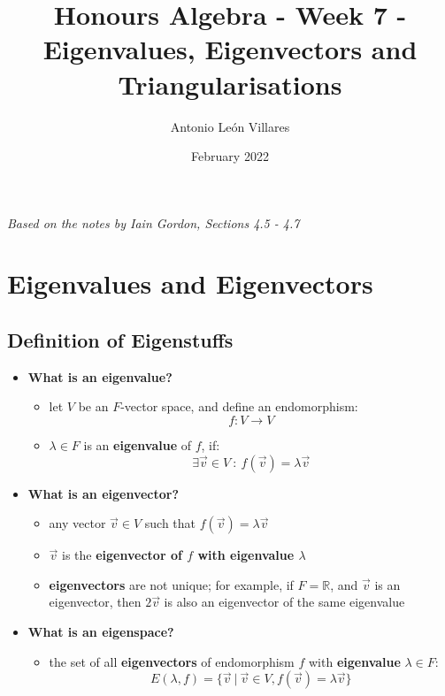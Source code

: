 \documentclass{exam}
\title{Honours Algebra - Week 7 - Eigenvalues, Eigenvectors and Triangularisations}
\author{Antonio León Villares}
\date{February 2022}
\begin{document}
\maketitle

\tableofcontents

\pagebreak

\textit{Based on the notes by Iain Gordon, Sections 4.5 - 4.7}

\section{Eigenvalues and Eigenvectors}

\subsection{Definition of Eigenstuffs}

\begin{itemize}
    \item \textbf{What is an eigenvalue?}
    \begin{itemize}
        \item let $V$ be an $F$-vector space, and define an endomorphism:
        \[
        f : V \to V
        \]
        \item $\lambda \in F$ is an \textbf{eigenvalue} of $f$, if:
        \[
        \exists \vec{v} \in V \ : \ f(\vec{v}) = \lambda \vec{v}
        \]
    \end{itemize}
    \item \textbf{What is an eigenvector?}
        \begin{itemize}
            \item any vector $\vec{v} \in V$ such that $f(\vec{v}) = \lambda \vec{v}$
            \item $\vec{v}$ is the \textbf{eigenvector of $f$ with eigenvalue $\lambda$}
            \item \textbf{eigenvectors} are not unique; for example, if $F = \mathbb{R}$, and $\vec{v}$ is an eigenvector, then $2\vec{v}$ is also an eigenvector of the same eigenvalue
        \end{itemize}
        \item \textbf{What is an eigenspace?}
        \begin{itemize}
            \item the set of all \textbf{eigenvectors} of endomorphism $f$ with \textbf{eigenvalue} $\lambda \in F$:
            \[
            E(\lambda, f) = \{\vec{v} \ | \ \vec{v} \in V, f(\vec{v}) = \lambda \vec{v}\}
            \]
        \end{itemize}
\end{itemize}
\end{document}
